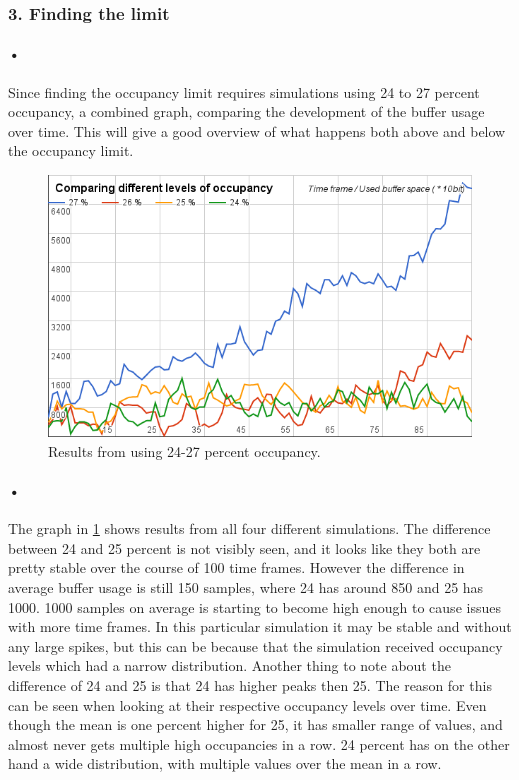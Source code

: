 \documentclass[a4paper, 12pt]{report}
\begin{document}
\subsubsection{3. Finding the limit} %

\paragraph{•}
Since finding the occupancy limit requires simulations using 24 to 27 percent occupancy, a combined graph, comparing the development of the buffer usage over time.
This will give a good overview of what happens both above and below the occupancy limit.

\begin{figure}[h!]
	\centering
		\includegraphics[width=1.0\textwidth]{images/24-27-occ.png}
		\caption{Results from using 24-27 percent occupancy.}
		\label{fig:24-27-occ}
\end{figure}

\paragraph{•}
The graph in \ref{fig:24-27-occ} shows results from all four different simulations.
The difference between 24 and 25 percent is not visibly seen, and it looks like they both are pretty stable over the course of 100 time frames.
However the difference in average buffer usage is still 150 samples, where 24 has around 850 and 25 has 1000.
1000 samples on average is starting to become high enough to cause issues with more time frames.
In this particular simulation it may be stable and without any large spikes, but this can be because that the simulation received occupancy levels which had a narrow distribution.
Another thing to note about the difference of 24 and 25 is that 24 has higher peaks then 25.
The reason for this can be seen when looking at their respective occupancy levels over time.
Even though the mean is one percent higher for 25, it has smaller range of values, and almost never gets multiple high occupancies in a row.
24 percent has on the other hand a wide distribution, with multiple values over the mean in a row. 
\end{document}
